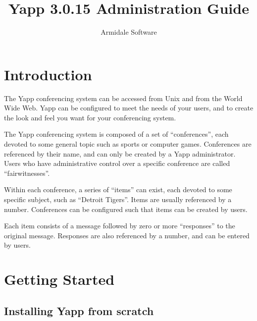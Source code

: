 \documentclass[twoside]{report}
\begin{document}
\pagestyle{empty}
\title{Yapp 3.0.15 Administration Guide}
\author{Armidale Software}
\maketitle
\newpage
\mbox{}
\newpage
{}
\pagestyle{headings}
\tableofcontents
\newpage

\chapter{Introduction}
   The Yapp conferencing system can be accessed from Unix and from the
   World Wide Web.  Yapp can be configured to meet the needs of your 
   users, and to create the look and feel you want for your conferencing 
   system.

   The Yapp conferencing system is composed of a set of 
   ``conferences'', each
   devoted to some general topic such as sports or computer games.
   Conferences are referenced by their name, and can only be created by
   a Yapp administrator.  Users who have administrative control over a
   specific conference are called ``fairwitnesses''.
   
   Within each conference, a series of ``items'' can exist, 
   each devoted to some specific subject, such as ``Detroit Tigers''.  
   Items are usually referenced by a number.  Conferences can be 
   configured such that items can be created by users.
 
   Each item consists of a message followed by zero or more 
   ``responses'' to the original message.  Responses are 
   also referenced by a number, and can be entered by users.

\chapter{Getting Started} \label{c:start}

\section{Installing Yapp from scratch}~\label{s:install}
\end{document}
